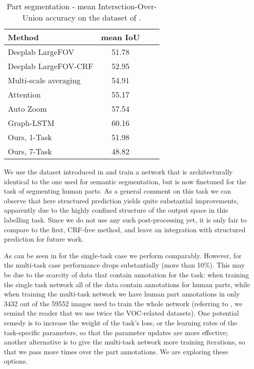 \documentclass[10pt,twocolumn,letterpaper]{article}
\begin{document}
 
 \begin{table}[!h]
 	\begin{tabular}{|l|c|c|c|}
 		\hline
 		Method & mean IoU \\\hline\hline
 		Deeplab LargeFOV \cite{HAZN} & 51.78\\\hline
 		Deeplab LargeFOV-CRF\cite{HAZN} & 52.95 \\\hline
 		Multi-scale averaging \cite{ChenYWXY15} & 54.91 \\\hline
 		Attention \cite{ChenYWXY15} & 55.17\\\hline
 		Auto Zoom  \cite{HAZN} & 57.54\\\hline
 		Graph-LSTM \cite{LiangSFLY16} & 60.16\\\hline
 		Ours, 1-Task & 51.98\\\hline
 		Ours, 7-Task & 48.82 \\\hline
 	\end{tabular}
 	\caption{Part segmentation - mean Intersction-Over-Union accuracy on the dataset of \cite{chen_cvpr14}. \label{table:results_e}}
 \end{table}
 
 We use the dataset introduced in \cite{chen_cvpr14} and train a network that is architecturally identical to the one used for semantic segmentation, but is now finetuned for the task of segmenting human parts. As a general comment on this task we can observe that here structured prediction yields  quite substantial improvements, apparently due to the highly confined structure of the output space in this labelling task. Since we do not use any such post-processing yet, it is only fair to compare to the first, CRF-free method, and leave an integration with structured prediction for future work.
 
 As can be seen in  for the single-task case we perform comparably. 
 However,  for the multi-task case performance drops substantially (more than 10$\%$). This  may be due to the scarcity of data that contain annotation for the task: when training the single task network all of the data contain annotations for human parts, while when training the multi-task network we have human part annotations in only 3432 out of  the 59552 images used to train the whole network (referring to , we remind the reader that we use twice the VOC-related datasets).
One potential remedy is to increase the weight of the task's loss, or the learning rates of the task-specific parameters, so that the parameter updates are more effective; another alternative is to give the multi-task network more training iterations, so that we pass more times over the part annotations. We are exploring these options. 
 
\end{document}
